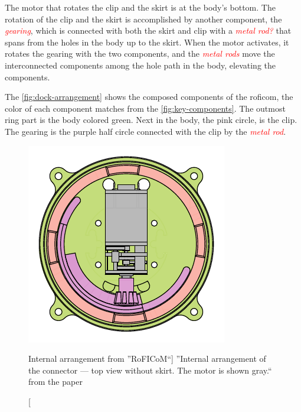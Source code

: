 \documentclass[
  digital,     %
  oneside,     %
  nosansbold,  %
  nocolorbold, %
  nolof,         %
  nolot,         %
]{fithesis4}
\newcommand{\TODO}[1]{\textcolor{red}{\textit{#1}}}
\begin{document}
The motor that rotates the clip and the skirt is at the body's bottom. The rotation of the clip and the skirt is accomplished by another component, the \TODO{gearing}, which is connected with both the skirt and clip with a \TODO{metal rod?} that spans from the holes in the body up to the skirt. When the motor activates, it rotates the gearing with the two components, and the \TODO{metal rods} move the interconnected components among the hole path in the body, elevating the components.

The \autoref{fig:dock-arrangement} shows the composed components of the \acrshort{roficom}, the color of each component matches from the \autoref{fig:key-components}. The outmost ring part is the body colored green. Next in the body, the pink circle, is the clip. The gearing is the purple half circle connected with the clip by the \TODO{metal rod}.

\begin{figure}
    \centering
    \includegraphics{ assets/dock-arrangement.pdf }
    \caption[Internal arrangement from ''RoFICoM``]{ ''Internal arrangement of the connector --- top view
    without skirt. The motor is shown gray.`` from the paper \cite{MrazekBarnat2019Roficom} }
    \label{fig:dock-arrangement}
\end{figure}

\end{document}

